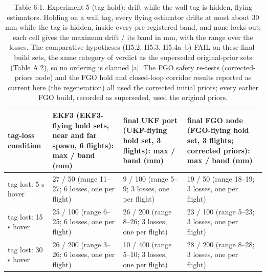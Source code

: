 \begin{table}[htbp]
\centering
\footnotesize
\caption{Table 6.1. Experiment 5 (tag hold): drift while the wall tag is hidden, flying estimators. Holding on a wall tag, every flying estimator drifts at most about 30 mm while the tag is hidden, inside every pre-registered band, and none locks out; each cell gives the maximum drift / its band in mm, with the range over the losses. The comparative hypotheses (H5.2, H5.3, H5.4a--b) FAIL on these final-build sets, the same category of verdict as the superseded original-prior sets (Table A.2), so no ordering is claimed [a]. The FGO safety re-tests (corrected-priors node) and the FGO hold and closed-loop corridor results reported as current here (the regeneration) all used the corrected initial priors; every earlier FGO build, recorded as superseded, used the original priors.}
\label{tab:6-1}
\begin{tabular}{p{}p{}p{}p{}}
\toprule
\textbf{tag-loss condition} & \textbf{EKF3 (EKF3-flying hold sets, near and far spawn, 6 flights): max / band (mm)} & \textbf{final UKF port (UKF-flying hold set, 3 flights): max / band (mm)} & \textbf{final FGO node (FGO-flying hold set, 3 flights; corrected priors): max / band (mm)} \\
\midrule
tag lost: 5 s hover & 27 / 50 (range 11--27; 6 losses, one per flight) & 9 / 100 (range 5--9; 3 losses, one per flight) & 19 / 50 (range 18--19; 3 losses, one per flight) \\
tag lost: 15 s hover & 25 / 100 (range 6--25; 6 losses, one per flight) & 26 / 200 (range 8--26; 3 losses, one per flight) & 23 / 100 (range 5--23; 3 losses, one per flight) \\
tag lost: 30 s hover & 26 / 200 (range 3--26; 6 losses, one per flight) & 10 / 400 (range 5--10; 3 losses, one per flight) & 28 / 200 (range 8--28; 3 losses, one per flight) \\

\end{tabular}
\end{table}
